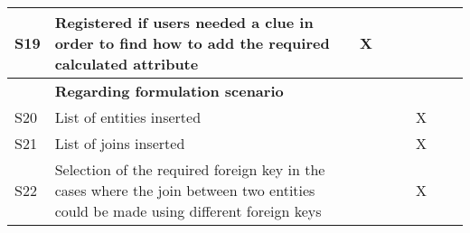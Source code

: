 \begin{longtable}{@{}lm{7cm}ccccccc@{}}
    S19         & Registered if users needed a clue in order to find how to add the required calculated attribute                                                         &                                                & X                                              &                                                &                                                &                                                &                                                &                                                \\* \midrule
                & \textbf{Regarding formulation scenario}                                                                                                                 &                                                &                                                &                                                &                                                &                                                &                                                &                                                \\* \midrule
    S20         & List of entities inserted                                                                                                                               &                                                &                                                &                                                &                                                & X                                              &                                                &                                                \\
    S21         & List of joins inserted                                                                                                                                  &                                                &                                                &                                                &                                                & X                                              &                                                &                                                \\
    S22         & Selection of the required foreign key in the cases where the join between two entities could be made using different foreign keys                       &                                                &                                                &                                                &                                                & X                                              &                                                &                                                \\

\end{longtable}
